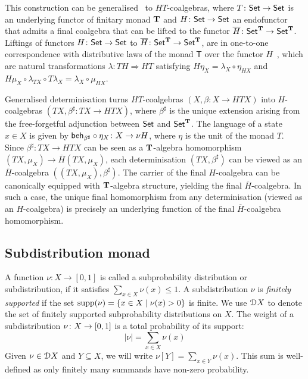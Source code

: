This construction can be generalised~\cite{Silva:2010:Generalizing} to $HT$-coalgebras, where $T \colon {\mathsf{Set}} \to {\mathsf{Set}}$ is an underlying functor of finitary monad $\mathbf{T}$ and $H \colon {\mathsf{Set}} \to {\mathsf{Set}}$ an endofunctor that admits a final coalgebra that can be lifted to the functor $\overline{H} \colon {\mathsf{Set}}^{\mathbf{T}} \to {\mathsf{Set}}^{\mathbf{T}}$. Liftings of functors $H \colon {\mathsf{Set}} \to {\mathsf{Set}}$ to $\overline{H} \colon {\mathsf{Set}}^{\mathbf{T}} \to {\mathsf{Set}}^{\mathbf{T}}$, are in one-to-one correspondence with distributive laws of the monad $\mathsf{T}$ over the functor $H$~\cite{Jacobs:2015:Trace}, which are natural transformations $\lambda \colon TH \Rightarrow HT$ satisfying
$H\eta_X = \lambda_X \circ \eta_{HX}$ and $H \mu_X \circ \lambda_{TX} \circ T\lambda_X = \lambda_X \circ \mu_{HX}$. 

Generalised determinisation turns $HT$-coalgebras $(X, \beta \colon X \to HT X)$ into $H$-coalgebras $(T X , \beta^\sharp \colon T X \to H T X)$, where $\beta^\sharp$ is the unique extension arising from the free-forgetful adjunction between ${\mathsf{Set}}$ and ${\mathsf{Set}}^{\mathbf{T}}$. The language of a state $x \in X$ is given by $\mathsf{beh}_{\beta^\sharp} \circ \eta_X \colon X \to \nu H$, where $\eta$ is the unit of the monad $T$. Since $\beta^\sharp \colon TX \to HTX$ can be seen as a $\mathbf{T}$-algebra homomorphism $(TX, \mu_X) \to \overline{H}(TX, \mu_X)$, each determinisation $(TX, \beta^{\sharp})$ can be viewed as an $\overline{H}$-coalgebra $((TX, \mu_X), \beta^{\sharp})$. The carrier of the final $H$-coalgebra can be canonically equipped with $\mathbf{T}$-algebra structure, yielding the final $\overline{H}$-coalgebra. In such a case, the unique final homomorphism from any determinisation (viewed as an $H$-coalgebra) is precisely an underlying function of the final $\overline{H}$-coalgebra homomorphism. 

\subsection{Subdistribution monad}\label{c4:subsec:subdistribution}
 A function $\nu \colon X \to [0,1]$ is called a subprobability distribution or subdistribution, if it satisfies $\sum_{x \in X} \nu(x) \leq 1$. A subdistribution $\nu$ is \emph{finitely supported}  if the set $\operatorname{supp}(\nu) = \{x \in X \mid \nu(x) > 0\}$ is finite. We use $\mathcal{D} {X}$ to denote the set of finitely supported subprobability distributions on $X$. The weight of a subdistribution $\nu \colon X \to \interval{0}{1}$ is a total probability of its support:
$$|\nu| = \sum_{x \in X} \nu(x)$$
Given $\nu\in\mathcal{D} X$ and $Y \subseteq X$, we will write $\nu[Y] = \sum_{x \in Y} \nu(x)$. This sum is well-defined as only finitely many summands have non-zero probability. 
 

